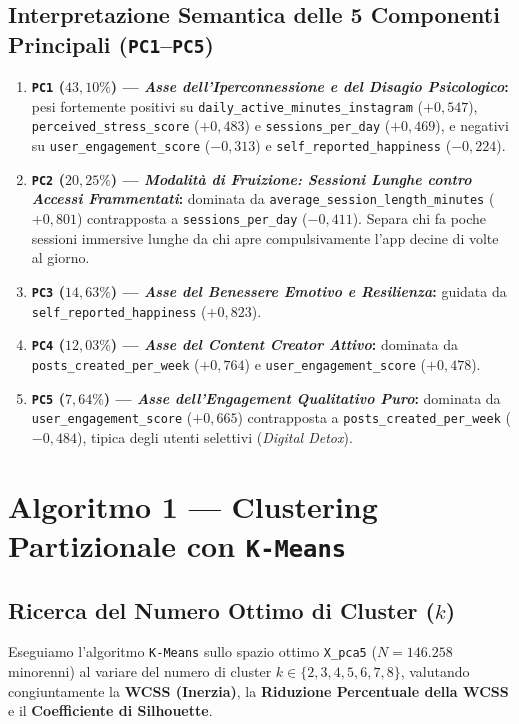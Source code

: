 \subsection{Interpretazione Semantica delle 5 Componenti Principali (\texttt{PC1}--\texttt{PC5})}
\begin{enumerate}
    \item \textbf{\texttt{PC1} ($43,10\%$) --- \emph{Asse dell'Iperconnessione e del Disagio Psicologico}:} pesi fortemente positivi su \texttt{daily\_active\_minutes\_instagram} ($+0,547$), \texttt{perceived\_stress\_score} ($+0,483$) e \texttt{sessions\_per\_day} ($+0,469$), e negativi su \texttt{user\_engagement\_score} ($-0,313$) e \texttt{self\_reported\_happiness} ($-0,224$).
    \item \textbf{\texttt{PC2} ($20,25\%$) --- \emph{Modalità di Fruizione: Sessioni Lunghe contro Accessi Frammentati}:} dominata da \texttt{average\_session\_length\_minutes} ($+0,801$) contrapposta a \texttt{sessions\_per\_day} ($-0,411$). Separa chi fa poche sessioni immersive lunghe da chi apre compulsivamente l'app decine di volte al giorno.
    \item \textbf{\texttt{PC3} ($14,63\%$) --- \emph{Asse del Benessere Emotivo e Resilienza}:} guidata da \texttt{self\_reported\_happiness} ($+0,823$).
    \item \textbf{\texttt{PC4} ($12,03\%$) --- \emph{Asse del Content Creator Attivo}:} dominata da \texttt{posts\_created\_per\_week} ($+0,764$) e \texttt{user\_engagement\_score} ($+0,478$).
    \item \textbf{\texttt{PC5} ($7,64\%$) --- \emph{Asse dell'Engagement Qualitativo Puro}:} dominata da \texttt{user\_engagement\_score} ($+0,665$) contrapposta a \texttt{posts\_created\_per\_week} ($-0,484$), tipica degli utenti selettivi (\emph{Digital Detox}).
\end{enumerate}

\section{Algoritmo 1 --- Clustering Partizionale con \texttt{K-Means}}
\label{sec:kmeans}

\subsection{Ricerca del Numero Ottimo di Cluster ($k$)}
Eseguiamo l'algoritmo \texttt{K-Means} sullo spazio ottimo \texttt{X\_pca5} ($N = 146.258$ minorenni) al variare del numero di cluster $k \in \{2, 3, 4, 5, 6, 7, 8\}$, valutando congiuntamente la \textbf{WCSS (Inerzia)}, la \textbf{Riduzione Percentuale della WCSS} e il \textbf{Coefficiente di Silhouette}.

